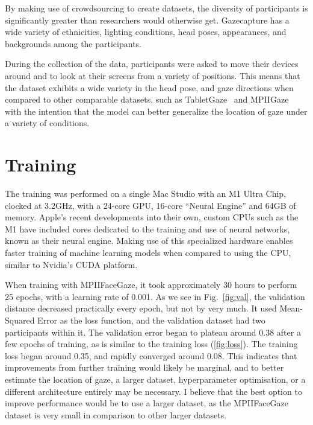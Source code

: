 \documentclass{report}
\begin{document}
By making use of crowdsourcing to create datasets, the diversity of participants is significantly greater than researchers would otherwise get. Gazecapture has a wide variety of ethnicities, lighting conditions, head poses, appearances, and backgrounds among the participants.

During the collection of the data, participants were asked to move their devices around and to look at their screens from a variety of positions. This means that the dataset exhibits a wide variety in the head pose, and gaze directions when compared to other comparable datasets, such as TabletGaze~\cite{huang2016tabletgaze} and MPIIGaze~\cite{zhang15cvpr} with the intention that the model can better generalize the location of gaze under a variety of conditions.


\section{Training}
\label{sec:training}

The training was performed on a single Mac Studio with an M1 Ultra Chip, clocked at 3.2GHz, with a 24-core GPU, 16-core ``Neural Engine'' and 64GB of memory. Apple's recent developments into their own, custom CPUs such as the M1 have included cores dedicated to the training and use of neural networks, known as their neural engine. Making use of this specialized hardware enables faster training of machine learning models when compared to using the CPU, similar to Nvidia's CUDA platform. 

When training with MPIIFaceGaze, it took approximately 30 hours to perform 25 epochs, with a learning rate of 0.001. As we see in Fig.~\ref{fig:val}, the validation distance decreased practically every epoch, but not by very much. It used Mean-Squared Error as the loss function, and the validation dataset had two participants within it. The validation error began to plateau around 0.38 after a few epochs of training, as is similar to the training loss (\autoref{fig:loss}). The training loss began around 0.35, and rapidly converged around 0.08. This indicates that improvements from further training would likely be marginal, and to better estimate the location of gaze, a larger dataset, hyperparameter optimisation, or a different architecture entirely may be necessary. I believe that the best option to improve performance would be to use a larger dataset, as the MPIIFaceGaze dataset is very small in comparison to other larger datasets. 
\end{document}
